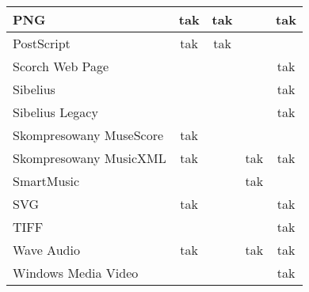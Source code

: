 \begin{center}
\begin{longtable}{|l|c|c|c|c|}
PNG                                           & tak       & tak      &        & tak      \\ \hline
PostScript                                    & tak       & tak      &        &          \\ \hline
Scorch Web Page                               &           &          &        & tak      \\ \hline
Sibelius                                      &           &          &        & tak      \\ \hline
Sibelius Legacy                               &           &          &        & tak      \\ \hline
Skompresowany MuseScore                       & tak       &          &        &          \\ \hline
Skompresowany MusicXML                        & tak       &          & tak    & tak      \\ \hline
SmartMusic                                    &           &          & tak    &          \\ \hline
SVG                                           & tak       &          &        & tak      \\ \hline
TIFF                                          &           &          &        & tak      \\ \hline
Wave Audio                                    & tak       &          & tak    & tak      \\ \hline
Windows Media Video                           &           &          &        & tak      \\ \hline
\end{longtable}
\end{center}